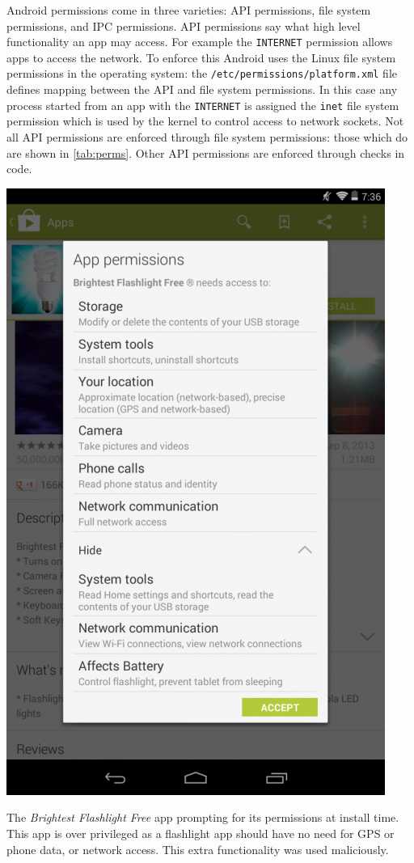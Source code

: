 \documentclass[a4paper,sfsidenotes]{%
  article%
}
\begin{document}
Android permissions come in three varieties: API permissions, file system
permissions, and IPC permissions.  API permissions say what high level
functionality an app may access.  For example the \texttt{INTERNET} permission
allows apps to access the network.  To enforce this Android uses the
Linux file system permissions in the operating system: the
\texttt{/etc/permissions/platform.xml} file defines mapping between the API
and file system permissions.  In this case any process started from an app with
the \texttt{INTERNET} is assigned the \texttt{inet} file system permission which
is used by the kernel to control access to network sockets.  Not all API
permissions are enforced through file system permissions: those which do are
shown in \autoref{tab:perms}.  Other API permissions are enforced through
checks in code.  

\begin{marginfigure}
  \centering
  \includegraphics[width=\smallmarginlength]{img/brightestflashlight.png}
  \caption{The \emph{Brightest Flashlight Free} app prompting for its permissions
    at install time. This app is over privileged as a flashlight app should have
    no need for GPS or phone data, or network access.  This extra functionality
  was used maliciously.}
\label{img:brightestflashlight}
\end{marginfigure}
\end{document}
